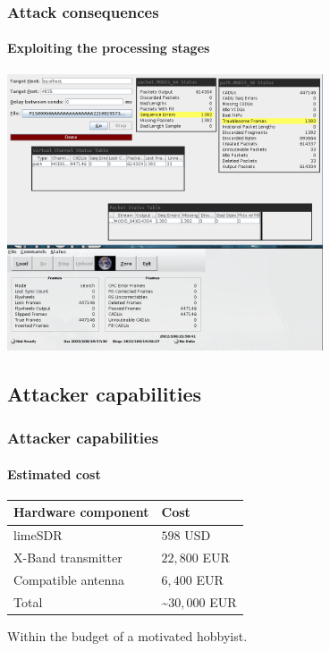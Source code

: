 \documentclass{beamer}
\begin{document}
\begin{frame}
  \frametitle{Attack consequences}
  \framesubtitle{Exploiting the processing stages}
  \centering
  \includegraphics[width=0.7\textwidth]{images/rtstps_incorrect.png}
\end{frame}


\subsection{Attacker capabilities}

\begin{frame}
  \frametitle{Attacker capabilities}
  \framesubtitle{Estimated cost}
  \centering
  \begin{tabular}{ l | l }
    \textbf{Hardware component} & \textbf{Cost} \\
    \hline
    limeSDR & $598$ USD \\
    X-Band transmitter & $22,800$ EUR \\
    Compatible antenna & $6,400$ EUR \\
    \hline
    Total & \~{}$30,000$ EUR
  \end{tabular}

  Within the budget of a motivated hobbyist.
\end{frame}
\end{document}
